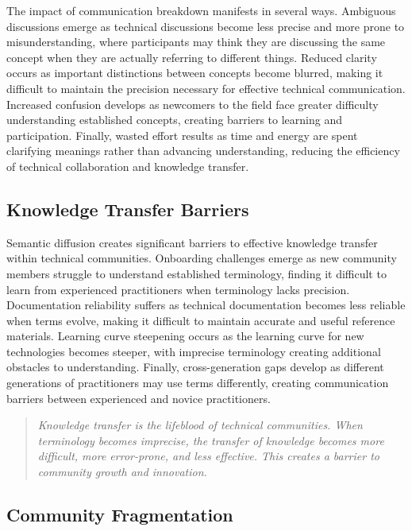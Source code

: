 \documentclass[11pt]{article}
\begin{document}
The impact of communication breakdown manifests in several ways. Ambiguous discussions emerge as technical discussions become less precise and more prone to misunderstanding, where participants may think they are discussing the same concept when they are actually referring to different things. Reduced clarity occurs as important distinctions between concepts become blurred, making it difficult to maintain the precision necessary for effective technical communication. Increased confusion develops as newcomers to the field face greater difficulty understanding established concepts, creating barriers to learning and participation. Finally, wasted effort results as time and energy are spent clarifying meanings rather than advancing understanding, reducing the efficiency of technical collaboration and knowledge transfer.

\subsection{Knowledge Transfer Barriers}

Semantic diffusion creates significant barriers to effective knowledge transfer within technical communities. Onboarding challenges emerge as new community members struggle to understand established terminology, finding it difficult to learn from experienced practitioners when terminology lacks precision. Documentation reliability suffers as technical documentation becomes less reliable when terms evolve, making it difficult to maintain accurate and useful reference materials. Learning curve steepening occurs as the learning curve for new technologies becomes steeper, with imprecise terminology creating additional obstacles to understanding. Finally, cross-generation gaps develop as different generations of practitioners may use terms differently, creating communication barriers between experienced and novice practitioners.

\begin{quote}
\emph{Knowledge transfer is the lifeblood of technical communities. When terminology becomes imprecise, the transfer of knowledge becomes more difficult, more error-prone, and less effective. This creates a barrier to community growth and innovation.}
\end{quote}

\subsection{Community Fragmentation}
\end{document}
